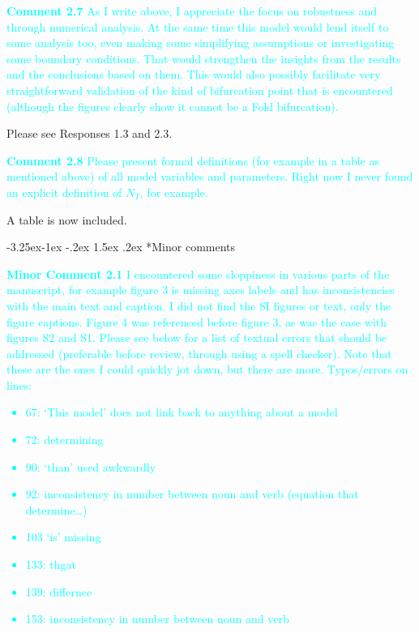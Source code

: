 \documentclass[ucm,12pt]{ucletter}
\makeatletter
\newcounter{section}
\newcounter{subsection}[section]
\newcommand\subsection{\@startsection{subsection}{2}{\z@}%
                                     {-3.25ex\@plus -1ex \@minus -.2ex}%
                                     {1.5ex \@plus .2ex}%
                                     {\normalfont\large\bfseries}}
\makeatother
\begin{document}
\begin{letter}
\noindent \textcolor{cyan}{
{\bf Comment 2.7} As I write above, I appreciate the focus on robustness and through numerical analysis. At the same time this model would lend itself to some analysis too, even making some simplifying assumptions or investigating some boundary conditions. That would strengthen the insights from the results and the conclusions based on them. This would also possibly facilitate very straightforward validation of the kind of bifurcation point that is encountered (although the figures clearly show it cannot be a Fold bifurcation).
}

 Please see Responses 1.3 and 2.3.

\noindent \textcolor{cyan}{
{\bf Comment 2.8} Please present formal definitions (for example in a table as mentioned above) of all model variables and parameters. Right now I never found an explicit definition of $N_T$, for example.
}

 A table is now included.


\subsection*{Minor comments}
\noindent \textcolor{cyan}{
{\bf Minor Comment 2.1} I encountered some sloppiness in various parts of the manuscript, for example figure 3 is missing axes labels and has inconsistencies with the main text and caption. I did not find the SI figures or text, only the figure captions. Figure 4 was referenced before figure 3, as was the case with figures S2 and S1. Please see below for a list of textual errors that should be addressed (preferable before review, through using a spell checker). Note that these are the ones I could quickly jot down, but there are more.
Typos/errors on lines:
\begin{itemize}
\item 67:   ‘This model’ does not link back to anything about a model
\item 72:   determining
\item 90:   ‘than’ used awkwardly
\item 92:   inconsistency in number between noun and verb (equation that determine…)
\item 103  ‘is’ missing
\item 133: thgat
\item 139: differnce
\item 153:  inconsistency in number between noun and verb
\end{itemize}
}


\end{letter}
\end{document}
